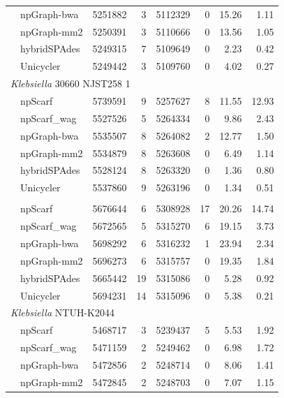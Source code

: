 \begin{longtable}[!hpt]{llcrrrrr}
\rowcolor{Gray}
& npGraph-bwa & 5251882  &  3  &  5112329  &  0  &  15.26 & 1.11\\*
\rowcolor{Gray}
& npGraph-mm2 &  5250391 &  3  &  5110666  &  0  &  13.56 & 1.05\\*
\rowcolor{Gray}
& hybridSPAdes & 5249315  &  7  &  5109649  &  0  &  2.23 &  0.42\\*
\rowcolor{Gray}
& Unicycler & 5249442  &  3  &  5109760  &  0  & 4.02 & 0.27 \\
\hline
\multicolumn{8}{l}{\emph{Klebsiella} 30660 NJST258 1} \\* %
\nobreakmidrule
& npScarf & 5739591  &  9  &  5257627  &  8  & 11.55  & 12.93\\*
& npScarf\_wag & 5527526  &  5  &  5264334  &  0  & 9.86  & 2.43\\*
& npGraph-bwa & 5535507  &  8  &  5264082  &  2  & 12.77  & 1.50\\*
& npGraph-mm2 & 5534879  &  8  &  5263608  &  0  & 6.49  & 1.14\\*
& hybridSPAdes &  5528124 & 8   &  5263320  &  0  & 1.36  & 0.80 \\*
& Unicycler & 5537860  &  9  &  5263196  &  0  & 1.34  & 0.51 \\
\hline
\rowcolor{Gray}
\multicolumn{8}{l}{\emph{Klebsiella} MGH 78578} \\* %
\nobreakmidrule
\rowcolor{Gray}
& npScarf &  5676644 &  6  &  5308928  &  17  & 20.26  & 14.74\\*
\rowcolor{Gray}
& npScarf\_wag & 5672565  &  5  &  5315270  &  6  &  19.15 & 3.73\\*
\rowcolor{Gray}
& npGraph-bwa &  5698292 &  6  &  5316232  &  1  & 23.94  & 2.34\\*
\rowcolor{Gray}
& npGraph-mm2 & 5696273  &  6  &  5315757  &  0  &  19.35 & 1.84\\*
\rowcolor{Gray}
& hybridSPAdes &  5665442 &  19  &  5315086  &  0  & 5.28  &  0.92\\*
\rowcolor{Gray}
& Unicycler &  5694231 &  14  &  5315096  &  0  & 5.38 &  0.21\\
\hline
\multicolumn{8}{l}{\emph{Klebsiella} NTUH-K2044} \\* %
\nobreakmidrule
& npScarf & 5468717  &  3  &  5239437  &  5  & 5.53  &  1.92\\*
& npScarf\_wag & 5471159  &  2  &  5249462  &  0  &  6.98 &  1.72\\*
& npGraph-bwa & 5472856  &  2  &  5248714  & 0  & 8.06  &  1.41\\*
& npGraph-mm2 &  5472845 &  2  &  5248703  &  0 &  7.07 &  1.15\\*

\end{longtable}
